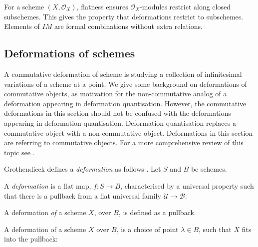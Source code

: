    For a scheme \((X,\mathcal{O}_X)\), flatness ensures \( \mathcal{O}_X\)-modules restrict along closed subschemes. This gives the property that deformations restrict to subschemes. Elements of \(I M\) are formal combinations without extra relations.

    
    \subsection{Deformations of schemes} 
    A commutative deformation of scheme is studying a collection of infinitesimal variations of a scheme at a point. We give some background on deformations of commutative objects, as motivation for the non-commutative analog of a deformation appearing in deformation quantisation. However, the commutative deformations in this section should not be confused with the deformations appearing in deformation quantisation. Deformation quantisation replaces a commutative object with a non-commutative object. Deformations in this section are referring to commutative objects. For a more comprehensive review of this topic see \cite{hartshorne_def}.
    
    Grothendieck defines a \emph{deformation} as follows \cite{}. Let \(S\) and \(B\) be schemes.
    
    \begin{defn}[Deformation]
    A \emph{deformation} is a flat map, \(f : S \rightarrow B \), characterised by a universal property such that there is a pullback from a flat universal family  \( \mathcal{U} \rightarrow \mathcal{B}\):
    \begin{center}
    \end{center}
    \end{defn}

    A deformation \emph{of} a scheme \(X\), over \(B\), is defined as a pullback. 
    
    \begin{defn} 
    A deformation of a scheme \(X\) over \(B\), is a choice of point \( \lambda \in B\), such that \(X\) fits into the pullback:
    \begin{center}
    \end{center}

    \end{defn}
    
